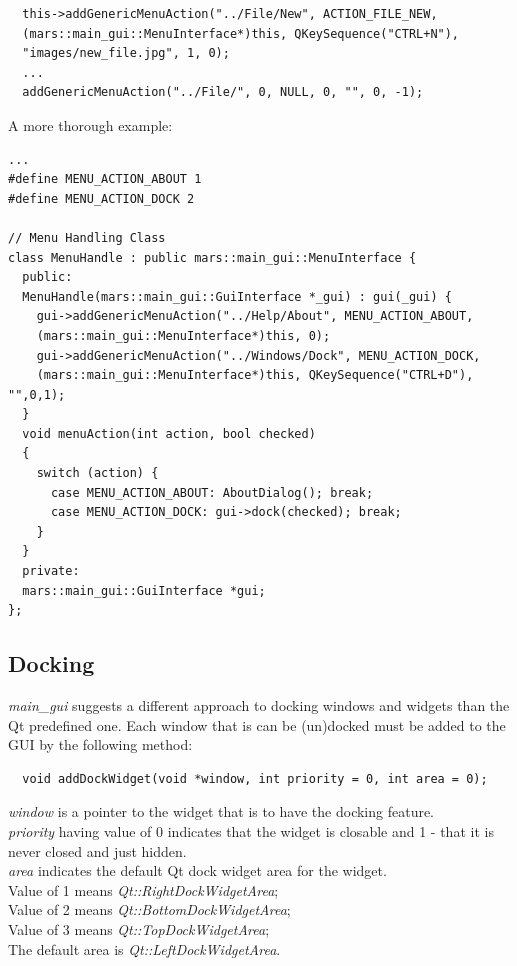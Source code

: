 \documentclass{article}
\begin{document}
\begin{lstlisting}
  this->addGenericMenuAction("../File/New", ACTION_FILE_NEW, 
  (mars::main_gui::MenuInterface*)this, QKeySequence("CTRL+N"), 
  "images/new_file.jpg", 1, 0);
  ...
  addGenericMenuAction("../File/", 0, NULL, 0, "", 0, -1);
\end{lstlisting}

A more thorough example:

\begin{lstlisting}
...
#define MENU_ACTION_ABOUT 1
#define MENU_ACTION_DOCK 2

// Menu Handling Class
class MenuHandle : public mars::main_gui::MenuInterface {
  public:
  MenuHandle(mars::main_gui::GuiInterface *_gui) : gui(_gui) {
    gui->addGenericMenuAction("../Help/About", MENU_ACTION_ABOUT,
    (mars::main_gui::MenuInterface*)this, 0);
    gui->addGenericMenuAction("../Windows/Dock", MENU_ACTION_DOCK, 
    (mars::main_gui::MenuInterface*)this, QKeySequence("CTRL+D"), "",0,1);
  }
  void menuAction(int action, bool checked)
  {
    switch (action) {
      case MENU_ACTION_ABOUT: AboutDialog(); break;
      case MENU_ACTION_DOCK: gui->dock(checked); break;
    }
  }
  private:
  mars::main_gui::GuiInterface *gui;
};

\end{lstlisting}  



\subsection{Docking}

\emph{main\_gui} suggests a different approach to docking windows and widgets than the Qt predefined one. Each window that is can be (un)docked must be added to the GUI by the following method:

\begin{lstlisting}
  void addDockWidget(void *window, int priority = 0, int area = 0);
\end{lstlisting}

\emph{window} is a pointer to the widget that is to have the docking feature.\\

\emph{priority} having value of 0 indicates that the widget is closable and 1 - that it is never closed and just hidden. \\

\emph{area} indicates the default Qt dock widget area for the widget. \\
Value of 1 means \emph{Qt::RightDockWidgetArea};\\
Value of 2 means \emph{Qt::BottomDockWidgetArea};\\ 
Value of 3 means \emph{Qt::TopDockWidgetArea};\\ 
The default area is \emph{Qt::LeftDockWidgetArea}.\\
\end{document}

